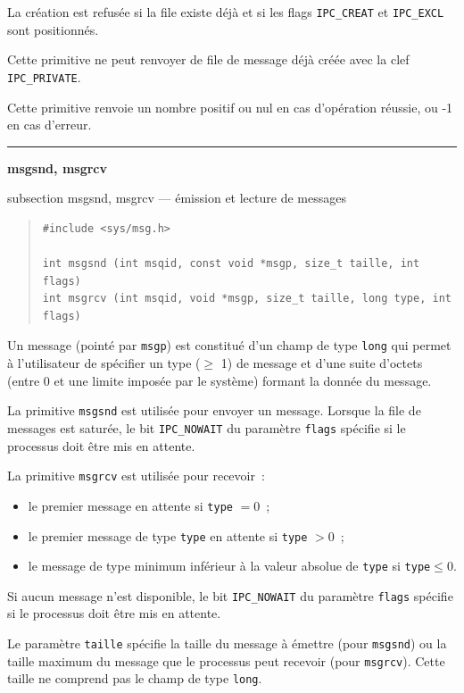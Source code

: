 \documentclass [twoside] {report}
\newcommand {\primitive} [1]
    {
	\phantomsection
	{\large \textbf {#1}}
	\addcontentsline {toc} {subsection} {#1}
    }
\newcommand {\separation}
    {
	\vspace {5mm}
	\nopagebreak
	\hrule
    }
\begin{document}
La création est refusée si la file existe déjà et si les flags
\texttt {IPC\_CREAT} et \texttt {IPC\_EXCL} sont positionnés.

Cette primitive ne peut renvoyer de file de message déjà créée avec la
clef \texttt {IPC\_PRIVATE}.

Cette primitive renvoie un nombre positif ou nul en cas d'opération
réussie, ou -1 en cas d'erreur.


\separation
\primitive {msgsnd, msgrcv} --- émission et lecture de messages

\begin {quote}
\begin {verbatim}
#include <sys/msg.h>

int msgsnd (int msqid, const void *msgp, size_t taille, int flags)
int msgrcv (int msqid, void *msgp, size_t taille, long type, int flags)
\end{verbatim}
\end {quote}

Un message (pointé par \texttt {msgp}) est constitué d'un champ de
type \texttt {long} qui permet à l'utilisateur de spécifier un type
($\geq$ 1) de message et d'une suite d'octets (entre 0 et une limite
imposée par le système) formant la donnée du message.

La primitive \texttt {msgsnd} est utilisée pour envoyer un message.  Lorsque
la file de messages est saturée, le bit \texttt {IPC\_NOWAIT} du paramètre
\texttt {flags} spécifie si le processus doit être mis en attente.

La primitive \texttt {msgrcv} est utilisée pour recevoir~:

\begin {itemize}
    \item le premier message en attente si \texttt {type} $= 0$~;
    \item le premier message de type \texttt {type} en attente si \texttt {type}
	$> 0$~;
    \item le message de type minimum inférieur à la valeur absolue de
	\texttt {type} si \texttt {type}$\leq 0$.
\end {itemize}

Si aucun message n'est disponible, le bit \texttt {IPC\_NOWAIT} du paramètre
\texttt {flags} spécifie si le processus doit être mis en attente.

Le paramètre \texttt {taille} spécifie la taille du message à émettre (pour
\texttt {msgsnd}) ou la taille maximum du message que le processus peut
recevoir (pour \texttt {msgrcv}).  Cette taille ne comprend pas le champ de
type \texttt {long}.
\end{document}
